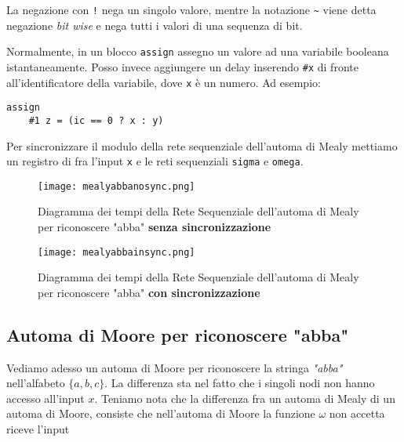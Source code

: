 La negazione con \verb|!| nega un singolo valore, mentre la notazione \verb|~| viene detta negazione \textit{bit wise} e nega tutti i valori di una sequenza di bit.

Normalmente, in un blocco \verb|assign| assegno un valore ad una variabile booleana istantaneamente. Posso invece aggiungere un delay inserendo \verb|#x| di fronte all'identificatore della variabile, dove \verb|x| è un numero. Ad esempio:
\begin{lstlisting}[style={verilog}]
assign 
	#1 z = (ic == 0 ? x : y)
\end{lstlisting}



Per sincronizzare il modulo della rete sequenziale dell'automa di Mealy mettiamo un registro di fra l'input \verb|x| e le reti sequenziali \verb|sigma| e \verb|omega|.

\begin{figure}[!htb]
	\centering 
	\caption{Diagramma dei tempi della Rete Sequenziale dell'automa di Mealy per riconoscere "abba" \textbf{senza sincronizzazione}}
	\texttt{[image: mealyabbanosync.png]}
\end{figure}

\begin{figure}[!htb]
	\centering 
	\caption{Diagramma dei tempi della Rete Sequenziale dell'automa di Mealy per riconoscere "abba" \textbf{con sincronizzazione}}
	\texttt{[image: mealyabbainsync.png]}
\end{figure}

\FloatBarrier

\subsection{Automa di Moore per riconoscere "abba"}
Vediamo adesso un automa di Moore per riconoscere la stringa \textit{"abba"} nell'alfabeto $ \{a,b,c\} $. La differenza sta nel fatto che i singoli nodi non hanno accesso all'input $ x $. Teniamo nota che la differenza fra un automa di Mealy di un automa di Moore, consiste che nell'automa di Moore la funzione $ \omega $ non accetta riceve l'input

